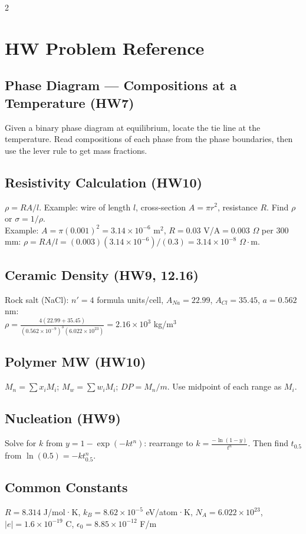 \documentclass[7pt]{article}
\begin{document}
\begin{multicols*}{2}
\section*{HW Problem Reference}
\subsection*{Phase Diagram — Compositions at a Temperature (HW7)}
Given a binary phase diagram at equilibrium, locate the tie line at the temperature. Read compositions of each phase from the phase boundaries, then use the lever rule to get mass fractions.
\subsection*{Resistivity Calculation (HW10)}
$\rho = RA/l$. Example: wire of length $l$, cross-section $A=\pi r^2$, resistance $R$. Find $\rho$ or $\sigma=1/\rho$. \\
Example: $A=\pi(0.001)^2=3.14\times10^{-6}$ m$^2$, $R=0.03$ V/A$=0.003$ $\Omega$ per 300 mm: $\rho=RA/l = (0.003)(3.14\times10^{-6})/(0.3) = 3.14\times10^{-8}$ $\Omega\cdot$m.
\subsection*{Ceramic Density (HW9, 12.16)}
Rock salt (NaCl): $n'=4$ formula units/cell, $A_{Na}=22.99$, $A_{Cl}=35.45$, $a=0.562$ nm: \\
$\rho = \frac{4(22.99+35.45)}{(0.562\times10^{-9})^3(6.022\times10^{23})} = 2.16\times10^3$ kg/m$^3$
\subsection*{Polymer MW (HW10)}
$M_n=\sum x_i M_i$; $M_w=\sum w_i M_i$; $DP=M_n/m$. Use midpoint of each range as $M_i$.
\subsection*{Nucleation (HW9)}
Solve for $k$ from $y=1-\exp(-kt^n)$: rearrange to $k=\frac{-\ln(1-y)}{t^n}$. Then find $t_{0.5}$ from $\ln(0.5)=-kt_{0.5}^n$.
\subsection*{Common Constants}
$R=8.314$ J/mol·K, $k_B=8.62\times10^{-5}$ eV/atom·K, $N_A=6.022\times10^{23}$, $|e|=1.6\times10^{-19}$ C, $\epsilon_0=8.85\times10^{-12}$ F/m

\end{multicols*}
\end{document}
